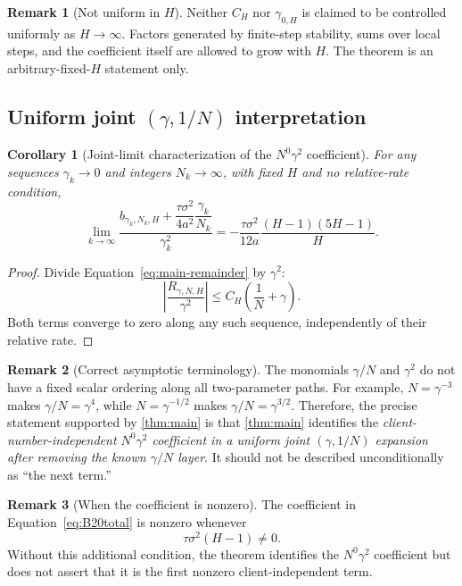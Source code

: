 \documentclass[11pt]{article}
\newtheorem{corollary}[corollary]{Corollary}
\theoremstyle{definition}
\newtheorem{remark}[remark]{Remark}
\begin{document}
\begin{remark}[Not uniform in $H$]
Neither $C_H$ nor $\gamma_{0,H}$ is claimed to be controlled uniformly as $H\to\infty$. Factors generated by finite-step stability, sums over local steps, and the coefficient itself are allowed to grow with $H$. The theorem is an arbitrary-fixed-$H$ statement only.
\end{remark}

\subsection{Uniform joint \texorpdfstring{$(\gamma,1/N)$}{(gamma, 1/N)} interpretation}

\begin{corollary}[Joint-limit characterization of the $N^0\gamma^2$ coefficient]
\label{cor:joint-limit}
For any sequences $\gamma_k\to0$ and integers $N_k\to\infty$, with fixed $H$ and no relative-rate condition,
\begin{equation}
\label{eq:joint-limit}
  \lim_{k\to\infty}
  \frac{
    b_{\gamma_k,N_k,H}
    +\dfrac{\tau\sigma^2}{4a^2}\dfrac{\gamma_k}{N_k}
  }{\gamma_k^2}
  =-\frac{\tau\sigma^2}{12a}
  \frac{(H-1)(5H-1)}{H}.
\end{equation}
\end{corollary}

\begin{proof}
Divide Equation~\eqref{eq:main-remainder} by $\gamma^2$:
\[
  \left|\frac{R_{\gamma,N,H}}{\gamma^2}\right|
  \le C_H\left(\frac1N+\gamma\right).
\]
Both terms converge to zero along any such sequence, independently of their relative rate.
\end{proof}

\begin{remark}[Correct asymptotic terminology]
The monomials $\gamma/N$ and $\gamma^2$ do not have a fixed scalar ordering along all two-parameter paths. For example, $N=\gamma^{-3}$ makes $\gamma/N=\gamma^4$, while $N=\gamma^{-1/2}$ makes $\gamma/N=\gamma^{3/2}$. Therefore, the precise statement supported by \cref{thm:main} is that \cref{thm:main} identifies the \emph{client-number-independent $N^0\gamma^2$ coefficient in a uniform joint $(\gamma,1/N)$ expansion after removing the known $\gamma/N$ layer}. It should not be described unconditionally as ``the next term.''
\end{remark}

\begin{remark}[When the coefficient is nonzero]
The coefficient in Equation~\eqref{eq:B20total} is nonzero whenever
\[
  \tau\sigma^2(H-1)\ne0.
\]
Without this additional condition, the theorem identifies the $N^0\gamma^2$ coefficient but does not assert that it is the first nonzero client-independent term.
\end{remark}
\end{document}
